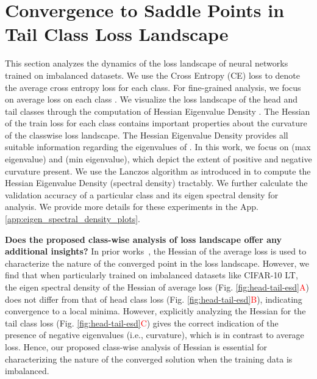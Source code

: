\documentclass{article}
\begin{document}
\section{Convergence to Saddle Points in Tail Class Loss Landscape}
\label{saddle_analysis}
This section analyzes the dynamics of the loss landscape of neural networks trained on imbalanced datasets. We use the Cross Entropy (CE) loss  to denote the average cross entropy loss for each class. For fine-grained analysis, we focus on average loss on each class . We visualize the loss landscape of the head and tail classes through the computation of Hessian Eigenvalue Density \cite{pmlr-v97-ghorbani19b}. The Hessian of the train loss for each class  contains important properties about the curvature of the classwise loss landscape. The Hessian Eigenvalue Density provides all suitable information regarding the eigenvalues of . In this work, we focus on (max eigenvalue) and (min eigenvalue), which depict the extent of positive and negative curvature present. We use the Lanczos algorithm as introduced in \citet{pmlr-v97-ghorbani19b} to compute the Hessian Eigenvalue Density (spectral density) tractably. We further calculate the validation accuracy of a particular class  and its eigen spectral density for analysis. We provide more details for these experiments in the App. \ref{app:eigen_spectral_density_plots}.

\textbf{Does the proposed class-wise analysis of loss landscape offer any additional insights?} In prior works~\cite{pmlr-v97-ghorbani19b,gilmer2021loss, li2020hessian}, the Hessian of the average loss is used to characterize the nature of the converged point in the loss landscape. However, we find that when particularly trained on imbalanced datasets like CIFAR-10 LT, the eigen spectral density of the Hessian of average loss (Fig. \ref{fig:head-tail-esd}\textcolor{red}{A}) does not differ from that of head class loss (Fig. \ref{fig:head-tail-esd}\textcolor{red}{B}), indicating convergence to a local minima. However, explicitly analyzing the Hessian for the tail class loss (Fig. \ref{fig:head-tail-esd}\textcolor{red}{C}) gives the correct indication of the presence of negative eigenvalues (i.e., curvature), which is in contrast to average loss. Hence, our proposed class-wise analysis of Hessian is essential for characterizing the nature of the converged solution when the training data is imbalanced.   
\end{document}
